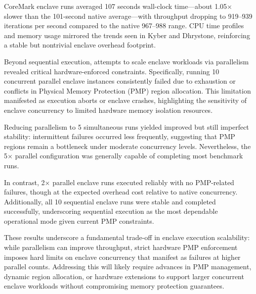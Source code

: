 CoreMark enclave runs averaged 107 seconds wall-clock time—about 1.05$\times$ slower than the 101-second native average—with throughput dropping to 919--939 iterations per second compared to the native 967--988 range. CPU time profiles and memory usage mirrored the trends seen in Kyber and Dhrystone, reinforcing a stable but nontrivial enclave overhead footprint.

Beyond sequential execution, attempts to scale enclave workloads via parallelism revealed critical hardware-enforced constraints. Specifically, running 10 concurrent parallel enclave instances consistently failed due to exhaustion or conflicts in Physical Memory Protection (PMP) region allocation. This limitation manifested as execution aborts or enclave crashes, highlighting the sensitivity of enclave concurrency to limited hardware memory isolation resources.

Reducing parallelism to 5 simultaneous runs yielded improved but still imperfect stability: intermittent failures occurred less frequently, suggesting that PMP regions remain a bottleneck under moderate concurrency levels. Nevertheless, the 5$\times$ parallel configuration was generally capable of completing most benchmark runs.

In contrast, 2$\times$ parallel enclave runs executed reliably with no PMP-related failures, though at the expected overhead cost relative to native concurrency. Additionally, all 10 sequential enclave runs were stable and completed successfully, underscoring sequential execution as the most dependable operational mode given current PMP constraints.


These results underscore a fundamental trade-off in enclave execution scalability: while parallelism can improve throughput, strict hardware PMP enforcement imposes hard limits on enclave concurrency that manifest as failures at higher parallel counts. Addressing this will likely require advances in PMP management, dynamic region allocation, or hardware extensions to support larger concurrent enclave workloads without compromising memory protection guarantees.

